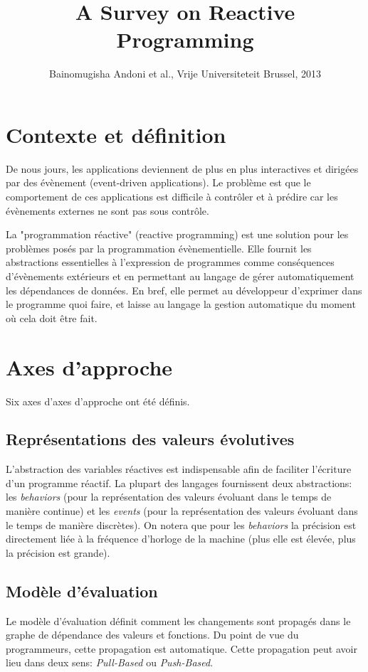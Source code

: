 \documentclass[10pt,final]{IEEEtran}
\begin{document}
\title{A Survey on Reactive Programming}

\author{Bainomugisha Andoni et al., Vrije Universiteteit Brussel, 2013}

\maketitle

\section{Contexte et définition}
De nous jours, les applications deviennent de plus en plus interactives et dirigées par des évènement (event-driven applications). Le problème est que le comportement de ces applications est difficile à contrôler et à prédire car les évènements externes ne sont pas sous contrôle.

La "programmation réactive" (reactive programming) est une solution pour les problèmes posés par la programmation évènementielle. Elle fournit les abstractions essentielles à l'expression de programmes comme conséquences d'évènements extérieurs et en permettant au langage de gérer automatiquement les dépendances de données. En bref, elle permet au développeur d'exprimer dans le programme quoi faire, et laisse au langage la gestion automatique du moment où cela doit être fait.

\section{Axes d'approche}
Six axes d'axes d'approche ont été définis.

\subsection{Représentations des valeurs évolutives}

L'abstraction des variables réactives est indispensable afin de faciliter l'écriture d'un programme réactif. La plupart des langages fournissent deux abstractions: les \textit{behaviors} (pour la représentation des valeurs évoluant dans le temps de manière continue) et les \textit{events} (pour la représentation des valeurs évoluant dans le temps de manière discrètes). On notera que pour les \textit{behaviors} la précision est directement liée à la fréquence d'horloge de la machine (plus elle est élevée, plus la précision est grande).

\subsection{Modèle d'évaluation}
Le modèle d'évaluation définit comment les changements sont propagés dans le graphe de dépendance des valeurs et fonctions. Du point de vue du programmeurs, cette propagation est automatique. Cette propagation peut avoir lieu dans deux sens: \textit{Pull-Based} ou \textit{Push-Based}.
\end{document}
